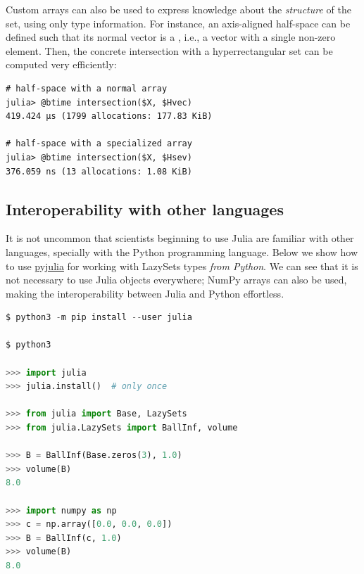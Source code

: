 \smallskip

Custom arrays can also be used to express knowledge about the \emph{structure} of the set, using only type information. For instance, an axis-aligned half-space can be defined such that its normal vector is a , i.e., a vector with a single non-zero element.
%
Then, the concrete intersection with a hyperrectangular set can be computed very efficiently:

\begin{minipage}{\linewidth}
\vspace{-\abovedisplayskip}
\begin{lstlisting}
# half-space with a normal array
julia> @btime intersection($X, $Hvec)
419.424 μs (1799 allocations: 177.83 KiB)

# half-space with a specialized array
julia> @btime intersection($X, $Hsev)
376.059 ns (13 allocations: 1.08 KiB)
\end{lstlisting}
\end{minipage}


\subsection{Interoperability with other languages}\label{sec:python}

It is not uncommon that scientists beginning to use Julia are familiar with other languages, specially with the Python programming language.
%
Below we show how to use \href{https://github.com/JuliaPy/pyjulia}{pyjulia} for working with LazySets types \emph{from Python}.
%
We can see that it is not necessary to use Julia objects everywhere; NumPy arrays can also be used, making the interoperability between Julia and Python effortless.

\begin{minipage}{\linewidth}
	\vspace{-\abovedisplayskip}
	\begin{lstlisting}[language=python]
$ python3 -m pip install --user julia

$ python3

>>> import julia
>>> julia.install()  # only once

>>> from julia import Base, LazySets
>>> from julia.LazySets import BallInf, volume

>>> B = BallInf(Base.zeros(3), 1.0)
>>> volume(B)
8.0

>>> import numpy as np
>>> c = np.array([0.0, 0.0, 0.0])
>>> B = BallInf(c, 1.0)
>>> volume(B)
8.0
	\end{lstlisting}
\end{minipage}
